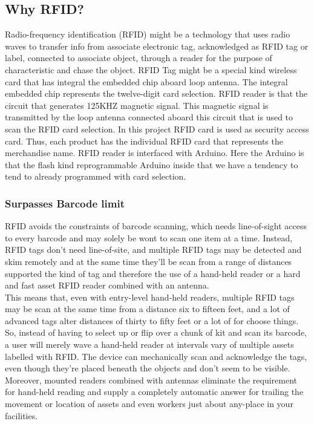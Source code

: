 \documentclass[12pt]{article}
\begin{document}
\subsection{Why RFID?}
\hspace*{1 cm}Radio-frequency identification (RFID) might be a technology that uses radio waves to transfer info from associate electronic tag, acknowledged as RFID tag or label, connected to associate object, through a reader for the purpose of characteristic and chase the object. RFID Tag might be a special kind wireless card that has integral the embedded chip aboard loop antenna. The integral embedded chip represents the twelve-digit card selection. RFID reader is that the circuit that generates 125KHZ magnetic signal. This magnetic signal is transmitted by the loop antenna connected aboard this circuit that is used to scan the RFID card selection. In this project RFID card is used as security access card. Thus, each product has the individual RFID card that represents the merchandise name. RFID reader is interfaced with Arduino. Here the Arduino is that the flash kind reprogrammable Arduino inside that we have a tendency to tend to already programmed with card selection.
\subsubsection{Surpasses Barcode limit}
\hspace*{1 cm}RFID avoids the constraints of barcode scanning, which needs line-of-sight access to every barcode and may solely be wont to scan one item at a time. Instead, RFID tags don't need line-of-site, and multiple RFID tags may be detected and skim remotely and at the same time they'll be scan from a range of distances supported the kind of tag and therefore the use of a hand-held reader or a hard and fast asset RFID reader combined with an antenna.\\
\hspace*{1 cm}This means that, even with entry-level hand-held readers, multiple RFID tags may be scan at the same time from a distance six to fifteen feet, and a lot of advanced tags alter distances of thirty to fifty feet or a lot of for choose things. So, instead of having to select up or flip over a chunk of kit and scan its barcode, a user will merely wave a hand-held reader at intervals vary of multiple assets labelled with RFID. The device can mechanically scan and acknowledge the tags, even though they're placed beneath the objects and don't seem to be visible. Moreover, mounted readers combined with antennas eliminate the requirement for hand-held reading and supply a completely automatic answer for trailing the movement or location of assets and even workers just about any-place in your facilities.
\end{document}
